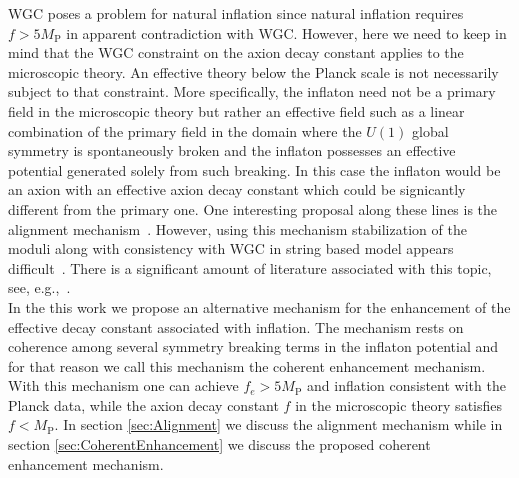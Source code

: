 \documentclass[11pt]{article}
\begin{document}
WGC poses a problem for natural inflation since natural inflation requires $f > 5 M_\text{P}$ in apparent contradiction with WGC.
However, here we need to keep in mind that the WGC constraint on the axion decay constant applies to the microscopic theory.
An effective theory below the Planck scale is not necessarily subject to that constraint.
More specifically, the inflaton need not be a primary field in the microscopic theory but rather an effective field such as a linear combination of the primary field in the domain where the $U\left(1\right)$ global symmetry is spontaneously broken and the inflaton possesses an effective potential generated solely from such breaking.
In this case the inflaton would be an axion with an effective axion decay constant which could be signicantly different from the primary one.
One interesting proposal along these lines is the alignment mechanism~\cite{Kim:2004rp}.
However, using this mechanism stabilization of the moduli along with consistency with WGC in string based model appears difficult~\cite{Long:2014dta}.
There is a significant amount of literature associated with this topic, see, e.g.,~\cite{Rudelius:2015xta, Rudelius:2014wla, Bachlechner:2014gfa, Choi:2014rja, delaFuente:2014aca, Blumenhagen:2014gta, Hebecker:2015rya, Conlon:2016aea, Montero:2015ofa, Junghans:2015hba}.\\

In the this work we propose an alternative mechanism for the enhancement of the effective decay constant associated with inflation.
The mechanism rests on coherence among several symmetry breaking terms in the inflaton potential and for that reason we call this mechanism the coherent enhancement mechanism.
With this mechanism one can achieve $f_e > 5 M_\text{P}$ and inflation consistent with the Planck data, while the axion decay constant $f$ in the microscopic theory satisfies $f < M_\text{P}$.
In section \ref{sec:Alignment} we discuss the alignment mechanism while in section \ref{sec:CoherentEnhancement} we discuss the proposed coherent enhancement mechanism.
\end{document}
